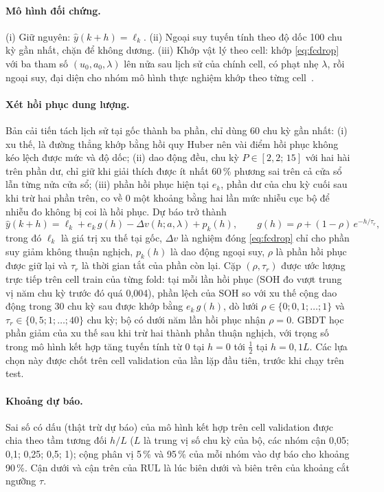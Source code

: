 \documentclass[12pt,a4paper,oneside]{report}
\theoremstyle{plain}
\theoremstyle{definition}
\begin{document}
\paragraph{Mô hình đối chứng.} (i) Giữ nguyên: $\hat y(k+h) = \ell_k$. (ii) Ngoại suy tuyến tính theo độ dốc 100 chu
kỳ gần nhất, chặn để không dương. (iii) Khớp vật lý theo cell: khớp \eqref{eq:fcdrop} với ba tham số
$(u_0, a_0, \lambda)$ lên nửa sau lịch sử của chính cell, có phạt nhẹ $\lambda$, rồi ngoại suy, đại diện cho nhóm
mô hình thực nghiệm khớp theo từng cell~\cite{he2011}.

\paragraph{Xét hồi phục dung lượng.} Bản cải tiến tách lịch sử tại gốc thành ba phần, chỉ dùng 60 chu kỳ gần nhất:
(i) xu thế, là đường thẳng khớp bằng hồi quy Huber nên vài điểm hồi phục không kéo lệch được mức và độ dốc;
(ii) dao động đều, chu kỳ $P \in [2{,}2;\,15]$ với hai hài trên phần dư, chỉ giữ khi giải thích được ít nhất 60\,\%
phương sai trên cả cửa sổ lẫn từng nửa cửa sổ; (iii) phần hồi phục hiện tại $e_k$, phần dư của chu kỳ cuối sau khi trừ hai
phần trên, co về 0 một khoảng bằng hai lần mức nhiễu cục bộ để nhiễu đo không bị coi là hồi phục. Dự báo trở thành
\begin{equation}\label{eq:fcrec}
  \hat y(k+h) = \ell_k + e_k\,g(h) - \Delta v(h; a, \lambda) + p_k(h), \qquad g(h) = \rho + (1 - \rho)\,e^{-h/\tau_r},
\end{equation}
trong đó $\ell_k$ là giá trị xu thế tại gốc, $\Delta v$ là nghiệm đóng \eqref{eq:fcdrop} chỉ cho phần suy giảm không
thuận nghịch, $p_k(h)$ là dao động ngoại suy, $\rho$ là phần hồi phục được giữ lại và $\tau_r$ là thời gian tắt của phần
còn lại. Cặp $(\rho, \tau_r)$ được ước lượng trực tiếp trên cell train của từng fold: tại mỗi lần hồi phục (SOH đo vượt
trung vị năm chu kỳ trước đó quá 0,004), phần lệch của SOH so với xu thế cộng dao động trong 30 chu kỳ sau được khớp
bằng $e_k\,g(h)$, dò lưới $\rho \in \{0; 0{,}1; \dots; 1\}$ và $\tau_r \in \{0{,}5; 1; \dots; 40\}$ chu kỳ; bộ có dưới năm
lần hồi phục nhận $\rho = 0$. GBDT học phần giảm của xu thế sau khi trừ hai thành phần thuận nghịch, với trọng số trong
mô hình kết hợp tăng tuyến tính từ 0 tại $h = 0$ tới $\tfrac{1}{2}$ tại $h = 0{,}1L$. Các lựa chọn này được chốt trên cell
validation của lần lặp đầu tiên, trước khi chạy trên test.

\paragraph{Khoảng dự báo.} Sai số có dấu (thật trừ dự báo) của mô hình kết hợp trên cell validation được chia theo
tầm tương đối $h/L$ ($L$ là trung vị số chu kỳ của bộ, các nhóm cận 0,05; 0,1; 0,25; 0,5; 1); cộng phân vị 5\,\% và
95\,\% của mỗi nhóm vào dự báo cho khoảng 90\,\%. Cận dưới và cận trên của RUL là lúc biên dưới và biên trên của
khoảng cắt ngưỡng $\tau$.
\end{document}
